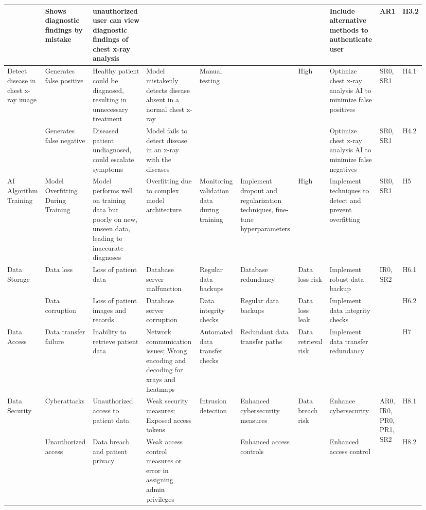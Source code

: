 \documentclass{article}
\begin{document}
\begin{landscape}
\begin{table}[hp]
\begin{footnotesize}
\begin{tabular}{|p{1in}|p{1in}|p{1in}|p{1.5in}|p{0.6in}|p{0.5in}|p{0.3in}|p{2.5in}|p{0.2in}|p{0.2in}|}
        \cline{2-3}\cline{8-10}
        & Shows diagnostic findings by mistake & unauthorized user can view diagnostic findings of chest x-ray analysis & & & & & Include alternative methods to authenticate user & AR1 & H3.2 \\
        \hline
        \multirow{2}{1in}{Detect disease in chest x-ray image} & Generates false positive & Healthy patient could be diagnosed, resulting in unnecessary treatment & Model mistakenly detects disease absent in a normal chest x-ray & \multirow{2}{0.6in}{Manual testing} & & \multirow{2}{0.3in}{High} & Optimize chest x-ray analysis AI to minimize false positives & SR0, SR1 & H4.1 \\
        \cline{2-4}\cline{8-10}
        & Generates false negative & Diseased patient undiagnosed, could escalate symptoms & Model fails to detect disease in an x-ray with the diseases & & & & Optimize chest x-ray analysis AI to minimize false negatives & SR0, SR1 & H4.2 \\
        \hline
        AI Algorithm Training & Model Overfitting During Training & Model performs well on training data but poorly on new, unseen data, leading to inaccurate diagnoses & Overfitting due to complex model architecture & Monitoring validation data during training & Implement dropout and regularization techniques, fine-tune hyperparameters & High & Implement techniques to detect and prevent overfitting & SR0, SR1 & H5 \\
        \hline
        \multirow{2}{1in}{Data Storage} & Data loss & Loss of patient data & Database server malfunction & Regular data backups & Database redundancy & Data loss risk & Implement robust data backup & \multirow{2}{0.2in}{IR0, SR2} & H6.1 \\
        \cline{2-8}\cline{10-10}
        & Data corruption & Loss of patient images and records & Database server corruption & Data integrity checks & Regular data backups & Data loss leak & Implement data integrity checks & & H6.2 \\
        \hline
        Data Access & Data transfer failure & Inability to retrieve patient data & Network communication issues; Wrong encoding and decoding for xrays and heatmaps & Automated data transfer checks & Redundant data transfer paths & Data retrieval risk & Implement data transfer redundancy & & H7 \\
        \hline
        \multirow{2}{1in}{Data Security} & Cyberattacks & Unauthorized access to patient data & Weak security measures: Exposed access tokens & \multirow{2}{0.6in}{Intrusion detection} & Enhanced cybersecurity measures & \multirow{2}{0.2in}{Data breach risk} & Enhance cybersecurity & \multirow{2}{0.2in}{AR0, IR0, PR0, PR1, SR2} & H8.1 \\
        \cline{2-4}\cline{6-6}\cline{8-8}\cline{10-10}
        & Unauthorized access & Data breach and patient privacy & Weak access control measures or error in assigning admin privileges & & Enhanced access controls & & Enhanced access control & & H8.2 \\
        

\end{tabular}
\end{footnotesize}
\end{table}
\end{landscape}
\end{document}

